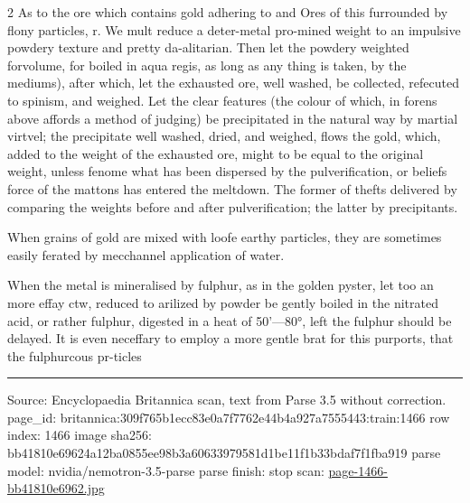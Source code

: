 \documentclass[10pt]{article}
\begin{document}
\begin{multicols}{2}
As to the ore which contains gold adhering to and Ores of this furrounded by flony particles, r. We mult reduce a deter-metal pro-mined weight to an impulsive powdery texture and pretty da-alitarian. Then let the powdery weighted forvolume, for boiled in aqua regis, as long as any thing is taken, by the mediums), after which, let the exhausted ore, well washed, be collected, refecuted to spinism, and weighed. Let the clear features (the colour of which, in forens above affords a method of judging) be precipitated in the natural way by martial virtvel; the precipitate well washed, dried, and weighed, flows the gold, which, added to the weight of the exhausted ore, might to be equal to the original weight, unless fenome what has been dispersed by the pulverification, or beliefs force of the mattons has entered the meltdown. The former of thefts delivered by comparing the weights before and after pulverification; the latter by precipitants.

When grains of gold are mixed with loofe earthy particles, they are sometimes easily ferated by mecchannel application of water.

When the metal is mineralised by fulphur, as in the golden pyster, let too an more effay ctw, reduced to arilized by powder be gently boiled in the nitrated acid, or rather fulphur, digested in a heat of 50’—80°, left the fulphur should be delayed. It is even neceffary to employ a more gentle brat for this purports, that the fulphurcous pr-ticles

\end{multicols}
\vfill\par\noindent\rule{\linewidth}{0.4pt}\par
{\scriptsize\color{gray}\noindent Source: Encyclopaedia Britannica scan, text from Parse 3.5 without correction. page\_id: britannica:309f765b1ecc83e0a7f7762e44b4a927a7555443:train:1466 \quad row index: 1466 \quad image sha256: bb41810e69624a12ba0855ee98b3a60633979581d1be11f1b33bdaf7f1fba919 \quad parse model: nvidia/nemotron-3.5-parse \quad parse finish: stop \quad scan: \href{../scans/page-1466-bb41810e6962.jpg}{page-1466-bb41810e6962.jpg}\par}
\end{document}
